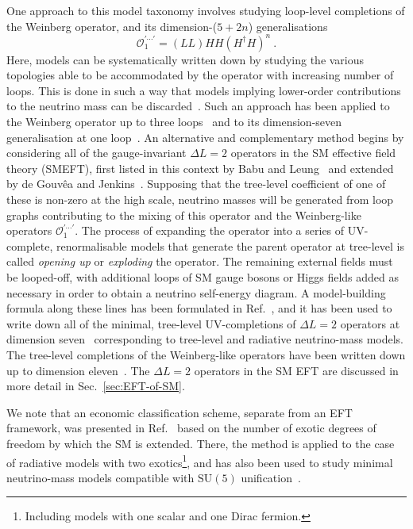 One approach to this model taxonomy involves studying loop-level completions of
the Weinberg operator, and its dimension-($5+2n$) generalisations
\begin{equation*}
 \mathcal{O}_1^{\prime \cdots \prime} = (LL)HH(H^\dagger H)^n  \ .
\end{equation*}
Here, models can be systematically written down by studying the various
topologies able to be accommodated by the operator with increasing number of
loops. This is done in such a way that models implying lower-order contributions
to the neutrino mass can be discarded~\cite{Farzan:2012ev}. Such an approach has
been applied to the Weinberg operator up to three loops~\cite{Bonnet:2012kz,
  Sierra:2014rxa, Cepedello:2018rfh} and to its dimension-seven generalisation
at one loop~\cite{Cepedello:2017eqf}. An alternative and complementary method
begins by considering all of the gauge-invariant $\Delta L = 2$ operators in the
SM effective field theory (SMEFT), first listed in this context by Babu and
Leung~\cite{Babu:2001ex} and extended by de Gouv\^{e}a and
Jenkins~\cite{deGouvea:2007qla}. Supposing that the tree-level coefficient of
one of these is non-zero at the high scale, neutrino masses will be generated
from loop graphs contributing to the mixing of this operator and the
Weinberg-like operators $\mathcal{O}_1^{\prime \cdots \prime}$. The process of
expanding the operator into a series of UV-complete, renormalisable models that
generate the parent operator at tree-level is called \emph{opening up} or
\emph{exploding} the operator. The remaining external fields must be looped-off,
with additional loops of SM gauge bosons or Higgs fields added as necessary in
order to obtain a neutrino self-energy diagram. A model-building formula along
these lines has been formulated in Ref.~\cite{PhysRevD.87.073007}, and it has
been used to write down all of the minimal, tree-level UV-completions of
$\Delta L = 2$ operators at dimension seven~\cite{Cai:2014kra} corresponding to
tree-level and radiative neutrino-mass models. The tree-level completions of the
Weinberg-like operators have been written down up to dimension
eleven~\cite{Cai:2014kra, Bonnet:2009ej, Anamiati:2018cuq}. {\color{red}The
  $\Delta L = 2$ operators in the SM EFT are discussed in more detail in
  Sec.~\ref{sec:EFT-of-SM}.}

We note that an economic classification scheme, separate from an EFT framework,
was presented in Ref.~\cite{Klein:2019iws} based on the number of exotic degrees
of freedom by which the SM is extended. There, the method is applied to the case
of radiative models with two exotics\footnote{Including models with one scalar
  and one Dirac fermion.}, and has also been used to study minimal neutrino-mass
models compatible with $\mathrm{SU}(5)$ unification~\cite{Klein:2019jgb}.

